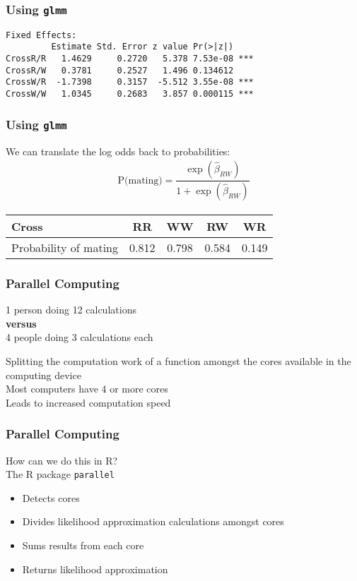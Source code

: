 \documentclass{beamer}
\begin{document}
\begin{frame}[fragile]
\frametitle{Using \texttt{glmm}}

\begin{verbatim}
Fixed Effects:
         Estimate Std. Error z value Pr(>|z|)    
CrossR/R   1.4629     0.2720   5.378 7.53e-08 ***
CrossR/W   0.3781     0.2527   1.496 0.134612    
CrossW/R  -1.7398     0.3157  -5.512 3.55e-08 ***
CrossW/W   1.0345     0.2683   3.857 0.000115 ***
\end{verbatim}

\end{frame}

\begin{frame}[fragile]
\frametitle{Using \texttt{glmm}}

We can translate the log odds back to probabilities:
\begin{align*}
 \text{P(mating)} = \dfrac{\exp \left(\hat{\beta}_{RW}\right)}{1+\exp \left(\hat{\beta}_{RW}\right)}
\end{align*}

\vspace{.1cm}
\begin{tabular}{l|cccc}
Cross & RR & WW& RW & WR  \\ \hline 
Probability of mating &   0.812&0.798& 0.584& 0.149  \\ 
\end{tabular}
\end{frame}

\begin{frame}
\frametitle{Parallel Computing}

\begin{center}
1 person doing 12 calculations \\
\textbf{versus} \\
4 people doing 3 calculations each \\
\end{center}
\vspace{.5cm}
Splitting the computation work of a function amongst the cores available in the computing device \\
\vspace{.25cm}
Most computers have 4 or more cores \\
\vspace{.25cm}
Leads to increased computation speed

\end{frame}

\begin{frame}
\frametitle{Parallel Computing}

How can we do this in R? \\
\vspace{.5cm}
The R package \texttt{parallel}
\begin{itemize}
    \item Detects cores
    \item Divides likelihood approximation calculations amongst cores
    \item Sums results from each core
    \item Returns likelihood approximation
\end{itemize}

\end{frame}
\end{document}
